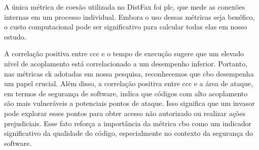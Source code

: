 A única métrica de coesão utilizada no DistFax foi \gls{plc}, que mede as conexões internas em um processo individual. Embora o uso dessas métricas seja benéfico, o custo computacional pode ser significativo para calcular todas elas em nosso estudo.

A correlação positiva entre \gls{ccc} e o tempo de execução sugere que um elevado nível de acoplamento está correlacionado a um desempenho inferior. Portanto, nas métricas \gls{ck} adotadas em nossa pesquisa, reconhecemos que \gls{cbo} desempenha um papel crucial. Além disso, a correlação positiva entre \gls{ccc} e a área de ataque, em termos de segurança de software, indica que códigos com alto acoplamento são mais vulneráveis a potenciais pontos de ataque. Isso significa que um invasor pode explorar esses pontos para obter acesso não autorizado ou realizar ações prejudiciais. Esse fato reforça a importância da métrica \gls{cbo} como um indicador significativo da qualidade do código, especialmente no contexto da segurança do software.